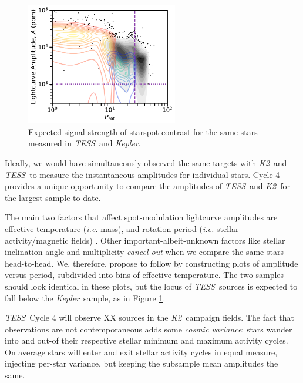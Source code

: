 \documentclass[letterpaper,12pt]{article}
\newcommand{\tess}{{\it TESS}}
\newcommand{\kepler}{{\it Kepler}}
\newcommand{\ktwo}{{\it K2}}
\begin{document}
\begin{figure}
    \vspace{0mm}
    \begin{center}
    \includegraphics[width=2.6in]{figures/fig1.pdf}
    \caption{Expected signal strength of starspot contrast for the same stars measured in \tess\ and \kepler. }
    \label{fig:expected}
    \vspace{0mm}
\end{center}
\end{figure}


Ideally, we would have simultaneously observed the same targets with \ktwo\ and \tess\ to measure the instantaneous amplitudes for individual stars.  Cycle 4 provides a unique opportunity to compare the amplitudes of \tess\ and \ktwo\ for the largest sample to date.

The main two factors that affect spot-modulation lightcurve amplitudes are effective temperature (\emph{i.e.} mass), and rotation period (\emph{i.e.} stellar activity/magnetic fields) \cite{2014ApJS..211...24M}.  Other important-albeit-unknown factors like stellar inclination angle and multiplicity \emph{cancel out} when we compare the same stars head-to-head.  We, therefore, propose to follow \cite{2014ApJS..211...24M} by constructing plots of amplitude versus period, subdivided into bins of effective temperature.  The two samples should look identical in these plots, but the locus of \tess\ sources is expected to fall below the \kepler\ sample, as in Figure \ref{fig:expected}.


\tess\ Cycle 4 will observe XX sources in the \ktwo\ campaign fields.  The fact that observations are not contemporaneous adds some \emph{cosmic variance}: stars wander into and out-of their respective stellar minimum and maximum activity cycles. On average stars will enter and exit stellar activity cycles in equal measure, injecting per-star variance, but keeping the subsample mean amplitudes the same.
\end{document}
